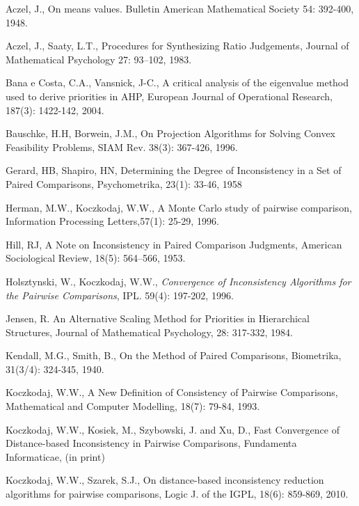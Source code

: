 \documentclass [12pt]{article}
\theoremstyle{definition}
\begin{document}
\begin{thebibliography}{9}


Aczel, J.,
On means values. Bulletin American Mathematical Society 54: 392-400, 1948.

Aczel, J., Saaty, L.T.,
Procedures for Synthesizing Ratio Judgements,
Journal of Mathematical Psychology 27: 93--102, 1983.

Bana e Costa, C.A., Vansnick, J-C., 
A critical analysis of the eigenvalue method used to derive priorities in AHP,
European Journal of Operational Research, 187(3): 1422-142, 2004.


Bauschke, H.H, Borwein, J.M.,  On Projection Algorithms for Solving Convex Feasibility Problems, SIAM Rev. 38(3): 367-426, 1996.


Gerard, HB, Shapiro, HN, Determining the Degree of Inconsistency in a Set of Paired Comparisons, Psychometrika,  23(1): 33-46, 1958

Herman, M.W., Koczkodaj, W.W.,
A Monte Carlo study of pairwise comparison,
Information Processing Letters,57(1): 25-29, 1996.

Hill, RJ, A Note on Inconsistency in Paired Comparison Judgments,
American Sociological Review, 18(5): 564--566, 1953.

Holsztynski, W., Koczkodaj, W.W., \emph{Convergence of Inconsistency
Algorithms for the Pairwise Comparisons}, IPL. 59(4): 197-202, 1996.

Jensen, R. An Alternative Scaling Method for Priorities in Hierarchical Structures,
Journal of Mathematical Psychology, 28: 317-332, 1984.

Kendall, M.G., Smith, B., On the Method of Paired Comparisons,
Biometrika, 31(3/4): 324-345, 1940.

Koczkodaj, W.W., A New Definition of Consistency of Pairwise Comparisons, 
Mathematical and Computer Modelling, 18(7): 79-84, 1993.

Koczkodaj, W.W., Kosiek, M., Szybowski, J. and Xu, D., Fast Convergence of Distance-based Inconsistency in Pairwise Comparisons, Fundamenta Informaticae, (in print)




 Koczkodaj, W.W., Szarek, S.J., On distance-based inconsistency reduction algorithms for pairwise comparisons, Logic J. of the IGPL, 18(6): 859-869, 2010.


\end{thebibliography}
\end{document}
